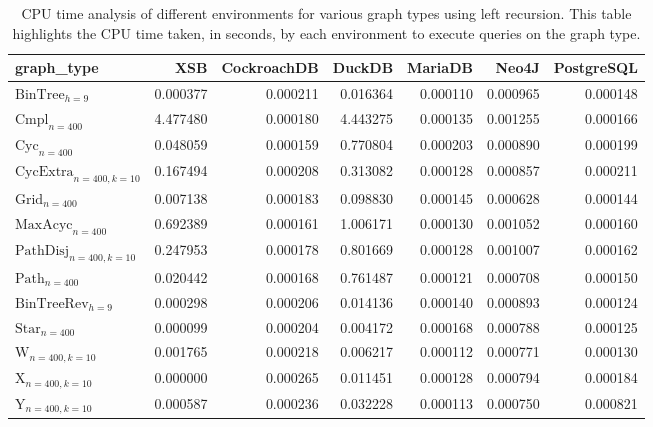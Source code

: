\begin{table}
\caption{CPU time analysis of different environments for various graph types using left recursion. This table highlights the CPU time taken, in seconds, by each environment to execute queries on the graph type.}
\label{table:results}
\begin{tabular}{lrrrrrr}
\toprule
graph\_type & XSB & CockroachDB & DuckDB & MariaDB & Neo4J & PostgreSQL \\
\midrule
$\text{BinTree}_{h=9}$ & 0.000377 & 0.000211 & 0.016364 & 0.000110 & 0.000965 & 0.000148 \\
$\text{Cmpl}_{n=400}$ & 4.477480 & 0.000180 & 4.443275 & 0.000135 & 0.001255 & 0.000166 \\
$\text{Cyc}_{n=400}$ & 0.048059 & 0.000159 & 0.770804 & 0.000203 & 0.000890 & 0.000199 \\
$\text{CycExtra}_{n=400,k=10}$ & 0.167494 & 0.000208 & 0.313082 & 0.000128 & 0.000857 & 0.000211 \\
$\text{Grid}_{n=400}$ & 0.007138 & 0.000183 & 0.098830 & 0.000145 & 0.000628 & 0.000144 \\
$\text{MaxAcyc}_{n=400}$ & 0.692389 & 0.000161 & 1.006171 & 0.000130 & 0.001052 & 0.000160 \\
$\text{PathDisj}_{n=400,k=10}$ & 0.247953 & 0.000178 & 0.801669 & 0.000128 & 0.001007 & 0.000162 \\
$\text{Path}_{n=400}$ & 0.020442 & 0.000168 & 0.761487 & 0.000121 & 0.000708 & 0.000150 \\
$\text{BinTreeRev}_{h=9}$ & 0.000298 & 0.000206 & 0.014136 & 0.000140 & 0.000893 & 0.000124 \\
$\text{Star}_{n=400}$ & 0.000099 & 0.000204 & 0.004172 & 0.000168 & 0.000788 & 0.000125 \\
$\text{W}_{n=400,k=10}$ & 0.001765 & 0.000218 & 0.006217 & 0.000112 & 0.000771 & 0.000130 \\
$\text{X}_{n=400, k=10}$ & 0.000000 & 0.000265 & 0.011451 & 0.000128 & 0.000794 & 0.000184 \\
$\text{Y}_{n=400,k=10}$ & 0.000587 & 0.000236 & 0.032228 & 0.000113 & 0.000750 & 0.000821 \\
\bottomrule
\end{tabular}
\end{table}
